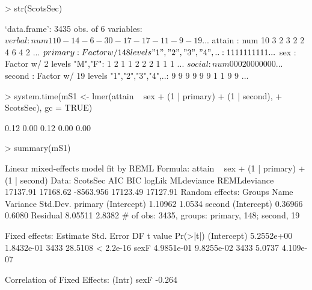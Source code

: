 \documentclass[12pt]{article}
\begin{document}
\begin{Schunk}
\begin{Sinput}
> str(ScotsSec)
\end{Sinput}
\begin{Soutput}
`data.frame':	3435 obs. of  6 variables:
 $ verbal : num  11 0 -14 -6 -30 -17 -17 -11 -9 -19 ...
 $ attain : num  10 3 2 3 2 2 4 6 4 2 ...
 $ primary: Factor w/ 148 levels "1","2","3","4",..: 1 1 1 1 1 1 1 1 1 1 ...
 $ sex    : Factor w/ 2 levels "M","F": 1 2 1 1 2 2 2 1 1 1 ...
 $ social : num  0 0 0 20 0 0 0 0 0 0 ...
 $ second : Factor w/ 19 levels "1","2","3","4",..: 9 9 9 9 9 9 1 1 9 9 ...
\end{Soutput}
\begin{Sinput}
> system.time(mS1 <- lmer(attain ~ sex + (1 | primary) + (1 | second), 
+     ScotsSec), gc = TRUE)
\end{Sinput}
\begin{Soutput}
[1] 0.12 0.00 0.12 0.00 0.00
\end{Soutput}
\begin{Sinput}
> summary(mS1)
\end{Sinput}
\begin{Soutput}
Linear mixed-effects model fit by REML
Formula: attain ~ sex + (1 | primary) + (1 | second) 
   Data: ScotsSec 
      AIC      BIC    logLik MLdeviance REMLdeviance
 17137.91 17168.62 -8563.956   17123.49     17127.91
Random effects:
 Groups   Name        Variance Std.Dev.
 primary  (Intercept) 1.10962  1.0534  
 second   (Intercept) 0.36966  0.6080  
 Residual             8.05511  2.8382  
# of obs: 3435, groups: primary, 148; second, 19

Fixed effects:
              Estimate Std. Error   DF t value  Pr(>|t|)
(Intercept) 5.2552e+00 1.8432e-01 3433 28.5108 < 2.2e-16
sexF        4.9851e-01 9.8255e-02 3433  5.0737 4.109e-07

Correlation of Fixed Effects:
     (Intr)
sexF -0.264
\end{Soutput}
\end{Schunk}


\end{document}
